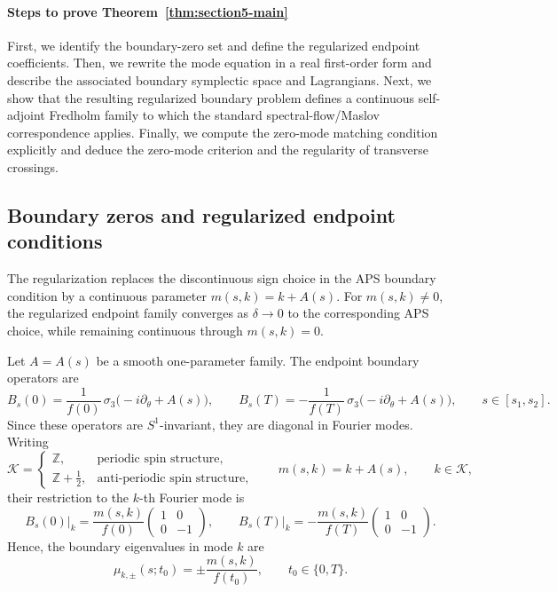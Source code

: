 \documentclass[11pt]{article}
\theoremstyle{definition}
\numberwithin{equation}{section}
\begin{document}
\paragraph{Steps to prove Theorem~\ref{thm:section5-main}}
First, we identify the boundary-zero set and define the regularized endpoint coefficients. Then, we rewrite the mode equation in a real first-order form and describe the associated boundary symplectic space and Lagrangians. Next, we show that the resulting regularized boundary problem defines a continuous self-adjoint Fredholm family to which the standard spectral-flow/Maslov correspondence applies. Finally, we compute the zero-mode matching condition explicitly and deduce the zero-mode criterion and the regularity of transverse crossings.

\subsection{Boundary zeros and regularized endpoint conditions}\label{subsec:boundary_zeros_regularized_bc}

The regularization replaces the discontinuous sign choice in the APS boundary condition by a continuous parameter \(m(s,k)=k+A(s)\). For \(m(s,k)\neq 0\), the regularized endpoint family converges as \(\delta\to 0\) to the corresponding APS choice, while remaining continuous through \(m(s,k)=0\).

Let \(A=A(s)\) be a smooth one-parameter family. The endpoint boundary operators are
\begin{equation}\label{eq:Bs-def}
B_s(0)=\frac{1}{f(0)}\,\sigma_3\bigl(-i\partial_\theta+A(s)\bigr),
\qquad
B_s(T)=-\frac{1}{f(T)}\,\sigma_3\bigl(-i\partial_\theta+A(s)\bigr),
\qquad s\in[s_1,s_2].
\end{equation}
Since these operators are \(S^1\)-invariant, they are diagonal in Fourier modes. Writing
\begin{equation}
\mathcal K=
\begin{cases}
\mathbb Z, & \text{periodic spin structure},\\
\mathbb Z+\tfrac12, & \text{anti-periodic spin structure},
\end{cases}
\qquad
m(s,k)=k+A(s),
\qquad k\in\mathcal K,
\end{equation}
their restriction to the \(k\)-th Fourier mode is
\begin{equation}\label{eq:Bs-eigs}
B_s(0)\big|_k
=
\frac{m(s,k)}{f(0)}
\begin{pmatrix}
1&0\\0&-1
\end{pmatrix},
\qquad
B_s(T)\big|_k
=
-\frac{m(s,k)}{f(T)}
\begin{pmatrix}
1&0\\0&-1
\end{pmatrix}.
\end{equation}
Hence, the boundary eigenvalues in mode \(k\) are
\begin{equation}
\mu_{k,\pm}(s;t_0)=\pm \frac{m(s,k)}{f(t_0)},
\qquad t_0\in\{0,T\}.
\end{equation}
\end{document}
